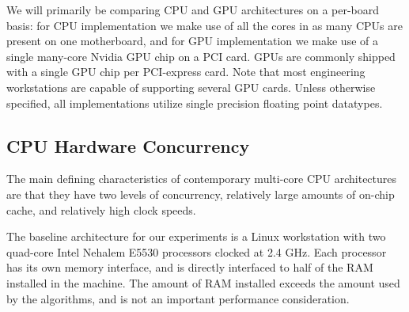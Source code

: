 \documentclass[10pt,twocolumn,letterpaper]{article}
\begin{document}
We will primarily be comparing CPU and GPU architectures on a per-board basis:
for CPU implementation we make use of all the cores in as many CPUs are present
on one motherboard, and for GPU implementation we make use of a single
many-core Nvidia GPU chip on a PCI card. GPUs are commonly shipped with a
single GPU chip per PCI-express card.  Note that most engineering  workstations
are capable of supporting several GPU cards.  Unless otherwise specified, all
implementations utilize single precision floating point datatypes.  

\subsection{CPU Hardware Concurrency} 
\label{sec:CPU-concurrency}
The main defining characteristics of contemporary multi-core CPU architectures
are that they have two levels of concurrency, relatively large amounts of
on-chip cache, and relatively high clock speeds.

The baseline architecture for our experiments is a Linux workstation with two
quad-core Intel Nehalem E5530 processors clocked at 2.4 GHz.  Each processor
has its own memory interface, and is directly interfaced to half of the RAM
installed in the machine.  The amount of RAM installed exceeds the amount used
by the algorithms, and is not an important performance consideration.  
\end{document}
